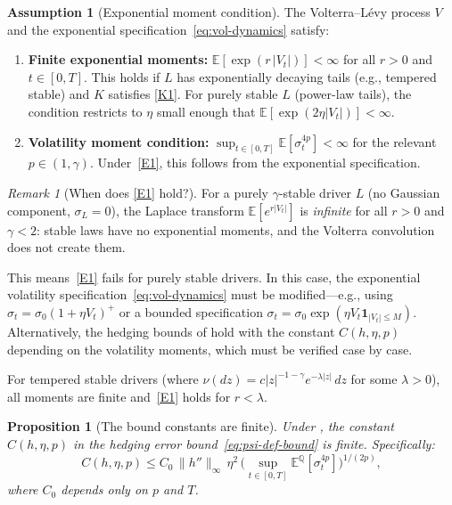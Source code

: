 \documentclass[11pt,a4paper]{article}
\theoremstyle{plain}
\newtheorem{proposition}[theorem]{Proposition}
\theoremstyle{definition}
\newtheorem{assumption}[theorem]{Assumption}
\theoremstyle{remark}
\newtheorem{remark}[theorem]{Remark}
\newcommand{\E}{\mathbb{E}}
\newcommand{\QQ}{\mathbb{Q}}
\begin{document}
\begin{assumption}[Exponential moment condition]
\label{ass:exp-moment}
The Volterra--L\'evy process $V$ and the exponential
specification~\eqref{eq:vol-dynamics} satisfy:
\begin{enumerate}[label=(E\arabic*)]
\item\label{E1} \textbf{Finite exponential moments:}
  $\E[\exp(r\,|V_t|)] < \infty$ for all $r > 0$ and
  $t \in [0,T]$.
  This holds if $L$ has exponentially decaying tails
  (e.g., tempered stable) and $K$ satisfies
  \ref{K1}.
  For purely stable $L$ (power-law tails), the condition
  restricts to $\eta$ small enough that
  $\E[\exp(2\eta|V_t|)] < \infty$.
\item\label{E2} \textbf{Volatility moment condition:}
  $\sup_{t \in [0,T]}\E[\sigma_t^{4p}] < \infty$ for
  the relevant $p \in (1,\gamma)$.  Under~\ref{E1}, this
  follows from the exponential specification.
\end{enumerate}
\end{assumption}

\begin{remark}[When does \ref{E1} hold?]\label{rem:E1}
For a purely $\gamma$-stable driver $L$ (no Gaussian component,
$\sigma_L = 0$), the Laplace transform $\E[e^{r|V_t|}]$
is \emph{infinite} for all $r > 0$ and $\gamma < 2$: stable
laws have no exponential moments, and the Volterra
convolution does not create them.

This means~\ref{E1} fails for purely stable drivers.  In
this case, the exponential volatility
specification~\eqref{eq:vol-dynamics} must be modified---e.g.,
using $\sigma_t = \sigma_0(1 + \eta V_t)^+$ or a bounded
specification $\sigma_t = \sigma_0\exp(\eta V_t
\mathbf{1}_{|V_t| \leq M})$.  Alternatively, the
hedging bounds of  hold
with the constant $C(h,\eta,p)$ depending on the
volatility moments, which must be verified case by case.

For tempered stable drivers (where
$\nu(dz) = c|z|^{-1-\gamma}e^{-\lambda|z|}\,dz$ for some
$\lambda > 0$), all moments are finite and~\ref{E1}
holds for $r < \lambda$.
\end{remark}

\begin{proposition}[The bound constants are finite]
\label{prop:constants-finite}
Under , the constant
$C(h,\eta,p)$ in the hedging error bound~\eqref{eq:psi-def-bound}
is finite.  Specifically:
\[
  C(h,\eta,p) \leq C_0\,\|h''\|_\infty\,\eta^2\,
  \bigl(\sup_{t \in [0,T]}\E^\QQ[\sigma_t^{4p}]\bigr)^{1/(2p)},
\]
where $C_0$ depends only on $p$ and $T$.
\end{proposition}
\end{document}
